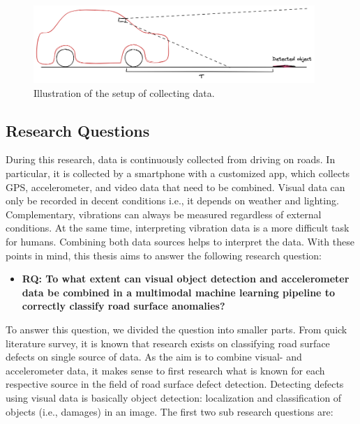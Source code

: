 \begin{figure}[ht]
    \begin{center}
    \includegraphics[width=0.95\textwidth]{images/1_introduction/setup-schema.png}
	\end{center}
    \captionsetup{width=.90\textwidth}
    \caption{Illustration of the setup of collecting data.}
    \label{fig:time-synchronization}
\end{figure}




\subsection{Research Questions}

During this research, data is continuously collected from driving on roads. In particular, it is collected by a smartphone with a customized app, which collects GPS, accelerometer, and video data that need to be combined. Visual data can only be recorded in decent conditions i.e., it depends on weather and lighting. Complementary, vibrations can always be measured regardless of external conditions. At the same time, interpreting vibration data is a more difficult task for humans. Combining both data sources helps to interpret the data. With these points in mind, this thesis aims to answer the following research question:

\begin{itemize}
\item \textbf{RQ: To what extent can visual object detection and accelerometer data be combined in a multimodal machine learning pipeline to correctly classify road surface anomalies?}
\end{itemize}

To answer this question, we divided the question into smaller parts. From quick literature survey, it is known that research exists on classifying road surface defects on single source of data. As the aim is to combine visual- and accelerometer data, it makes sense to first research what is known for each respective source in the field of road surface defect detection. Detecting defects using visual data is basically object detection: localization and classification of objects (i.e., damages) in an image. The first two sub research questions are:

